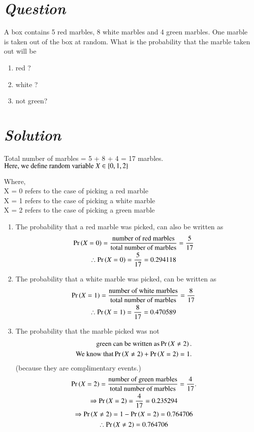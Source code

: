 \documentclass[journal,12pt,twocolumn]{IEEEtran}
\begin{document}
\section * {\emph{Question}}
A box contains 5 red marbles, 8 white marbles and 4 green marbles. One marble is taken out of the box at random. What is the probability that the marble taken out will be
\begin{enumerate}
    \item red ?
    \item white ?
    \item not green?
\end{enumerate} 
\section*{\emph{Solution}}
Total number of marbles = 5 + 8 + 4 = 17 marbles. 
\begin{math}
\\\text{Here, we define random variable }X \in  \left\{0, 1, 2\right\}
\end{math}

Where,
\\X = 0 refers to the case of picking a red marble
\\X = 1 refers to the case of picking a white marble
\\X = 2 refers to the case of picking a green marble
   
\begin{enumerate}
    \item The probability that a red marble was picked, can also be written as 
    \begin{multline*}
        \Pr\left(X=0\right) = \frac{\text{number of red marbles}}{\text{total number of marbles}} = \frac{5}{17}
        \\\therefore  \Pr\left(X=0\right) = \frac{5}{17} = 0.294118
    \end{multline*}
    \item The probability that a white marble was picked, can be written as 
    \begin{multline*}
        \Pr\left(X=1\right) = \frac{\text{number of white marbles}}{\text{total number of marbles}}
        = \frac{8}{17} 
        \\\therefore  \Pr\left(X=1\right) = \frac{8}{17} = 0.470589
    \end{multline*}
    \item The probability that the marble picked was not 
    \begin{align*}\text{green can be written as} \Pr\left(X \ne 2\right).
    \\\text{We know that} \Pr\left(X \ne 2\right) + \Pr\left(X = 2\right) = 1. 
    \end{align*}
     (because they are complimentary events.)
    \begin{multline*}
     \Pr\left(X=2\right) = \frac{\text{number of green marbles}}{\text{total number of marbles}}
     = \frac{4}{17}.
     \\\Rightarrow\Pr\left(X=2\right) = \frac{4}{17} = 0.235294
     \\\Rightarrow\Pr\left(X \ne 2\right) = 1 - \Pr\left(X=2\right) = 0.764706
     \\\therefore \Pr\left(X\ne2\right) = 0.764706
    \end{multline*}
\end{enumerate}
\end{document}
